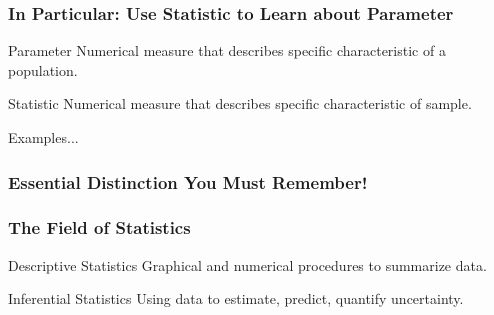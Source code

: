 \documentclass[handout]{beamer}
\begin{document}

\begin{frame}

\frametitle{In Particular: Use Statistic to Learn about Parameter}

\begin{block}{Parameter}
Numerical measure that describes specific characteristic of a population.
\end{block}

\begin{block}{Statistic}
Numerical measure that describes specific characteristic of sample.
\end{block}

\begin{block}{\hfill Examples...}\end{block}

\end{frame}


\begin{frame}
\frametitle{Essential Distinction You Must Remember!}
\begin{figure}
\centering
{}
\end{figure}
\end{frame}



\begin{frame}

\frametitle{The Field of Statistics}

\begin{block}{Descriptive Statistics}
Graphical and numerical procedures to summarize data.
\end{block}


\begin{block}{Inferential Statistics}
Using data to estimate, predict, quantify uncertainty.
\end{block}


\end{frame}
\end{document}
